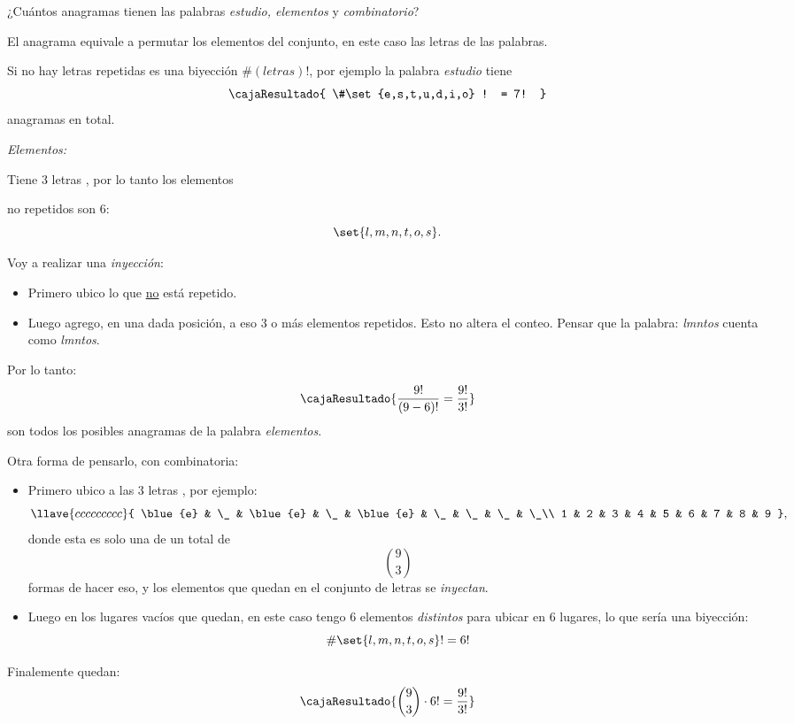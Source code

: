 \begin{enunciado}{\ejercicio}
	¿Cuántos anagramas tienen las palabras \textit{estudio, elementos} y \textit{combinatorio}?
\end{enunciado}

El anagrama equivale a permutar los elementos del conjunto, en este caso las letras de las palabras.

Si no hay letras repetidas es una biyección $\#(letras)!$, por ejemplo la palabra \textit{estudio} tiene
$$
	\cajaResultado{
		\#\set{e,s,t,u,d,i,o} ! = 7!
	}
$$
anagramas en total.

\bigskip

\textit{Elementos:}

Tiene 3 letras \textit{}, por lo tanto los elementos

no repetidos son 6:
$$
	\set{l,m,n,t,o,s}.
$$

Voy a realizar una \textit{inyección}:
\begin{itemize}
	\item Primero ubico lo que \underline{no} está repetido.
	\item Luego agrego, en una dada posición, a eso 3 o más elementos repetidos. Esto
	      no altera el conteo. Pensar que la palabra: \textit{lmntos}
	      cuenta como \textit{lmntos\blue{\_}\blue{\_}\blue{\_}}.
\end{itemize}
Por lo tanto:
$$
	\cajaResultado{
		\frac{9!}{(9-6)!} = \frac{9!}{3!}
	}
$$
son todos los posibles anagramas de la palabra \textit{elementos}.

Otra forma de pensarlo, con combinatoria:
\begin{itemize}
	\item Primero ubico a las 3 letras \textit{}, por ejemplo:
	      $$
		      \llave{c c c c c c c c c} {
			      \blue{e} & \_ & \blue{e} & \_ & \blue{e} & \_ & \_ & \_ & \_\\
			      1 & 2 & 3 & 4 & 5 & 6 & 7 & 8 & 9
		      },
	      $$
	      donde esta es solo una de un total de
	      $$
		      \binom{9}{3}
	      $$
	      formas de hacer eso, y los elementos que quedan en el conjunto de letras se \textit{inyectan}.

	\item
	      Luego en los lugares vacíos que quedan, en este caso tengo 6 elementos \textit{distintos}
	      para ubicar en 6 lugares, lo que sería una biyección:
	      $$
		      \#\set{l,m,n,t,o,s}! =  6!
	      $$
\end{itemize}
Finalemente quedan:
$$
	\cajaResultado{
		\binom{9}{3} \cdot 6!  = \frac{9!}{3!}
	}
$$


